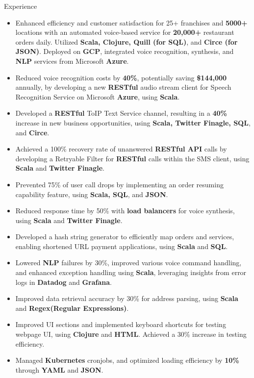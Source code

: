 \documentclass{resume} %
\begin{document}
\begin{workSection}{Experience}
      \experienceItem[
      company=Novo Labs Inc,
      location=Dallas{,} TX,
      position=Software Engineer,
      duration=Feb. 2021 – June 2023
      ]
      \vspace{-0.65em}
      \begin{itemize}
            \itemsep -6pt {}
            \item Enhanced efficiency and customer satisfaction for 25+ franchises and \textbf{5000+} locations with an automated voice-based service for \textbf{20,000+} restaurant orders daily. Utilized \textbf{Scala, Clojure, Quill (for SQL)}, and \textbf{Circe (for JSON)}. Deployed on \textbf{GCP}, integrated voice recognition, synthesis, and \textbf{NLP} services from Microsoft \textbf{Azure}.
            \item Reduced voice recognition costs by \textbf{40\%}, potentially saving \textbf{\$144,000} annually, by developing a new \textbf{RESTful} audio stream client for Speech Recognition Service on Microsoft \textbf{Azure}, using \textbf{Scala}.
            \item Developed a \textbf{RESTful} ToIP Text Service channel, resulting in a \textbf{40\%} increase in new business opportunities, using \textbf{Scala, Twitter Finagle, SQL}, and \textbf{Circe}.
            \item Achieved a 100\% recovery rate of unanswered \textbf{RESTful API} calls by developing a Retryable Filter for \textbf{RESTful} calls within the SMS client, using \textbf{Scala} and \textbf{Twitter Finagle}.
            \item Prevented 75\% of user call drops by implementing an order resuming capability feature, using \textbf{Scala, SQL}, and \textbf{JSON}.
            \item Reduced response time by 50\% with \textbf{load balancers} for voice synthesis, using \textbf{Scala} and \textbf{Twitter Finagle}.
            \item Developed a hash string generator to efficiently map orders and services, enabling shortened URL payment applications, using \textbf{Scala} and \textbf{SQL}.
            \item Lowered \textbf{NLP} failures by 30\%, improved various voice command handling, and enhanced exception handling using \textbf{Scala}, leveraging insights from error logs in \textbf{Datadog} and \textbf{Grafana}.
            \item Improved data retrieval accuracy by 30\% for address parsing, using \textbf{Scala} and \textbf{Regex(Regular Expressions)}.
            \item Improved UI sections and implemented keyboard shortcuts for testing webpage UI, using \textbf{Clojure} and \textbf{HTML}. Achieved a 30\% increase in testing efficiency.
            \item Managed \textbf{Kubernetes} cronjobs, and optimized loading efficiency by \textbf{10\%} through \textbf{YAML} and \textbf{JSON}.
      \end{itemize}


\end{workSection}
\end{document}
